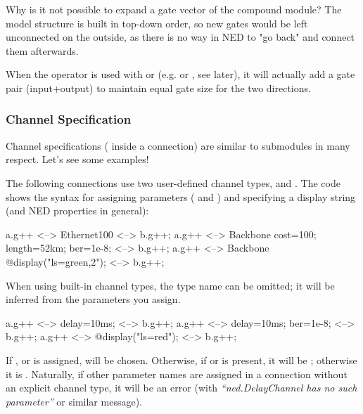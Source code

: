 \begin{note}
    Why is it not possible to expand a gate vector of the compound
    module? The model structure is built in top-down order, so new gates
    would be left unconnected on the outside, as there is no way in NED to
    "go back" and connect them afterwards.
\end{note}

When the \ttt{++} operator is used with  or 
(e.g.  or , see later), it will actually add
a gate pair (input+output) to maintain equal gate size for the two
directions.



\subsubsection{Channel Specification}

Channel specifications ( inside a connection)
are similar to submodules in many respect. Let's see some examples!

The following connections use two user-defined channel types,
 and . The code shows the syntax
for assigning parameters ( and ) and specifying
a display string (and NED properties in general):

\begin{ned}
a.g++ <--> Ethernet100 <--> b.g++;
a.g++ <--> Backbone {cost=100; length=52km; ber=1e-8;} <--> b.g++;
a.g++ <--> Backbone {@display("ls=green,2");} <--> b.g++;
\end{ned}

When using built-in channel types, the type name can be omitted; it
will be inferred from the parameters you assign.

\begin{ned}
a.g++ <--> {delay=10ms;} <--> b.g++;
a.g++ <--> {delay=10ms; ber=1e-8;} <--> b.g++;
a.g++ <--> {@display("ls=red");} <--> b.g++;
\end{ned}

If ,  or  is assigned,
 will be chosen. Otherwise, if  or
 is present, it will be ; otherwise it
is . Naturally, if other parameter names are assigned
in a connection without an explicit channel type, it will be an error (with
\textit{``ned.DelayChannel has no such parameter''} or similar message).

